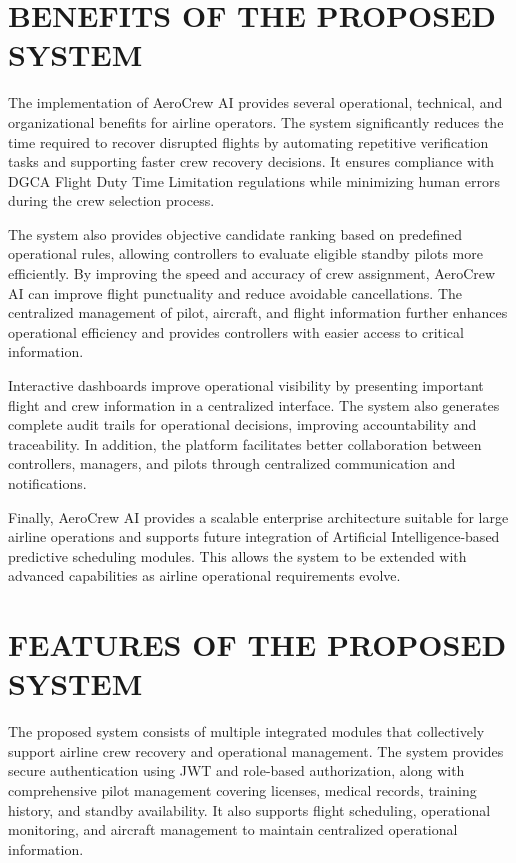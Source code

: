 \documentclass[12pt,a4paper]{report}
\begin{document}
\section{BENEFITS OF THE PROPOSED SYSTEM}

The implementation of AeroCrew AI provides several operational, technical, and organizational benefits for airline operators. The system significantly reduces the time required to recover disrupted flights by automating repetitive verification tasks and supporting faster crew recovery decisions. It ensures compliance with DGCA Flight Duty Time Limitation regulations while minimizing human errors during the crew selection process.

The system also provides objective candidate ranking based on predefined operational rules, allowing controllers to evaluate eligible standby pilots more efficiently. By improving the speed and accuracy of crew assignment, AeroCrew AI can improve flight punctuality and reduce avoidable cancellations. The centralized management of pilot, aircraft, and flight information further enhances operational efficiency and provides controllers with easier access to critical information.

Interactive dashboards improve operational visibility by presenting important flight and crew information in a centralized interface. The system also generates complete audit trails for operational decisions, improving accountability and traceability. In addition, the platform facilitates better collaboration between controllers, managers, and pilots through centralized communication and notifications.

Finally, AeroCrew AI provides a scalable enterprise architecture suitable for large airline operations and supports future integration of Artificial Intelligence-based predictive scheduling modules. This allows the system to be extended with advanced capabilities as airline operational requirements evolve.

\section{FEATURES OF THE PROPOSED SYSTEM}

The proposed system consists of multiple integrated modules that collectively support airline crew recovery and operational management. The system provides secure authentication using JWT and role-based authorization, along with comprehensive pilot management covering licenses, medical records, training history, and standby availability. It also supports flight scheduling, operational monitoring, and aircraft management to maintain centralized operational information.
\end{document}
